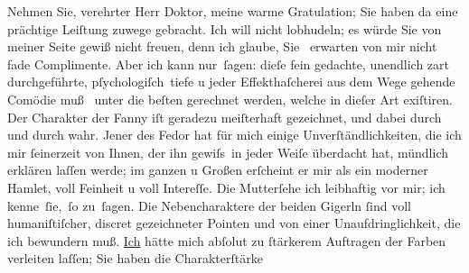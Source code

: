 \pstart
           Nehmen Sie, verehrter Herr Doktor, meine warme Gratulation; Sie haben da eine
               prächtige Leiſtung zuwege ge{\pb}bracht. Ich
               will nicht lobhudeln;  es würde Sie von meiner Seite
               gewiß nicht freuen, denn ich glaube, Sie  erwarten
               von mir nicht fade Complimente. Aber ich kann nur ſagen: dieſe fein gedachte, unendlich zart durchgeführte,
               pſychologiſch tiefe u jeder Effekthaſcherei aus dem Wege gehende Comödie muß  unter die beſten gerechnet werden, welche in dieſer Art exiſtiren. Der
               Charakter der Fanny iſt
               geradezu meiſterhaft gezeichnet, und dabei durch und durch wahr. Jener des Fedor hat für mich einige
               Unverſtändlichkeiten, die ich mir{ }ſeinerzeit von Ihnen, der ihn gewiſs in jeder Weiſe
               überdacht hat, mündlich erklären laſſen werde; im ganzen u Großen erſcheint er mir
               als ein moderner Hamlet, voll
                  Fein{\pb}heit u voll Intereſſe. Die Mutterſehe ich leibhaftig vor
               mir; ich kenne ſie, ſo zu ſagen. Die Nebencharaktere der beiden Gigerln{ }ſind voll
               humaniſtiſcher, discret gezeichneter Pointen und von einer Unaufdringlichkeit, die
               ich bewundern muß. \uline{Ich} hätte mich abſolut zu{ }ſtärkerem Auftragen der Farben verleiten laſſen; Sie haben die Charakterſtärke
